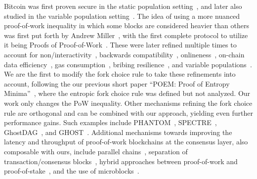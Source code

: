 \noindent
{}
Bitcoin was first proven secure in the static population setting~\cite{backbone},
and later also studied in the variable population setting~\cite{varbackbone}.
The idea of using a more nuanced proof-of-work inequality in which some blocks
are considered heavier than others was first put forth by Andrew Miller~\cite{highway},
with the first complete protocol to utilize it being
Proofs of Proof-of-Work~\cite{popow}. These were later refined multiple times
to account for non\-/interactivity~\cite{nipopows}, backwards compatibility~\cite{velvet-nipopows},
onlineness~\cite{logspace}, on-chain data efficiency~\cite{compact-superblocks},
gas consumption~\cite{gasefficient-nipopows},
bribing resilience~\cite{soft-power},
and variable populations~\cite{dionyziz}.
We are the first to modify the fork choice rule to take these refinements into
account, following \ifanonymous
the
\else
our
\fi
previous short paper ``POEM: Proof of Entropy Minima''~\cite{poem-short},
where the entropic fork choice rule was defined but not analyzed.
Our work only changes the PoW inequality.
Other mechanisms refining the fork choice rule
are orthogonal and can be combined with our approach, yielding even
further performance gains.
Such examples include
PHANTOM~\cite{phantom}, SPECTRE~\cite{spectre}, GhostDAG~\cite{ghostdag}, and
GHOST~\cite{ghost}.
Additional mechanisms towards improving the latency and throughput
of proof-of-work blockchains at the consensus
layer, also composable with ours, include parallel chains~\cite{parallel-chains},
separation of transaction/consensus blocks~\cite{prism},
hybrid approaches between proof-of-work and proof-of-stake~\cite{byzcoin},
and the use of microblocks~\cite{bitcoin-ng}.